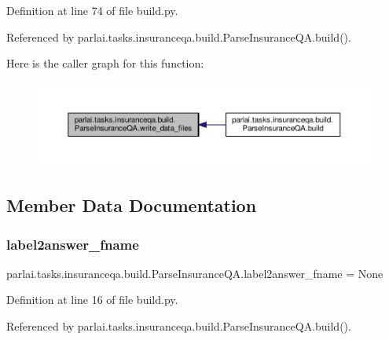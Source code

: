 Definition at line 74 of file build.\+py.



Referenced by parlai.\+tasks.\+insuranceqa.\+build.\+Parse\+Insurance\+Q\+A.\+build().

Here is the caller graph for this function\+:
\nopagebreak
\begin{figure}[H]
\begin{center}
\leavevmode
\includegraphics[width=350pt]{classparlai_1_1tasks_1_1insuranceqa_1_1build_1_1ParseInsuranceQA_abd3ae5efba9775554d68e911fd36c840_icgraph}
\end{center}
\end{figure}


\subsection{Member Data Documentation}
\mbox{\label{classparlai_1_1tasks_1_1insuranceqa_1_1build_1_1ParseInsuranceQA_a43a944262ff61deb4d06c2f9af01588f}} 
\subsubsection{\texorpdfstring{label2answer\+\_\+fname}{label2answer\_fname}}
{\footnotesize\ttfamily parlai.\+tasks.\+insuranceqa.\+build.\+Parse\+Insurance\+Q\+A.\+label2answer\+\_\+fname = None\hspace{0.3cm}{\ttfamily [static]}}



Definition at line 16 of file build.\+py.



Referenced by parlai.\+tasks.\+insuranceqa.\+build.\+Parse\+Insurance\+Q\+A.\+build().

